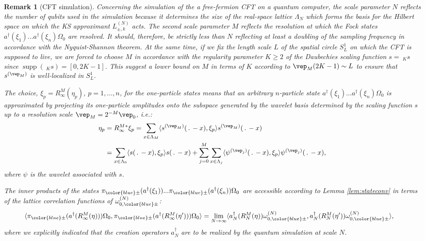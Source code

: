 \documentclass[a4paper, 11pt]{article}
\DeclareMathOperator{\1}{\mathds{1}}
\DeclareMathOperator{\supp}{supp}
\newtheorem{rem}[thm]{Remark}
\providecommand{\DIFaddbegin}{} %
\providecommand{\DIFaddend}{} %
\providecommand{\DIFaddincludegraphics}[2][]{{\color{blue}\fbox{\DIFOincludegraphics[#1]{#2}}}} %
\DeclareRobustCommand{\DIFaddbegin}{\DIFOaddbegin \let\includegraphics\DIFaddincludegraphics} %
\DeclareRobustCommand{\DIFaddend}{\DIFOaddend \let\includegraphics\DIFOincludegraphics} %
\begin{document}
\DIFaddend \begin{rem}[CFT simulation]
\label{rem:stateapprox}
Concerning the simulation of the a free-fermion CFT on a quantum computer, the scale parameter $N$ reflects the number of qubits used in the simulation because it determines the size of the real-space lattice $\Lambda_{N}$ which forms the basis for the Hilbert space on which the KS approximant $L^{(N)}_{\pm,k}$ acts. The second scale parameter $M$ reflects the resolution at which the Fock states $a^{\dagger}(\xi_{1})\dots a^{\dagger}(\xi_{n})\Omega_{0}$ are resolved. It should, therefore, be strictly less than $N$ reflecting at least a doubling of the sampling frequency in accordance with the Nyquist-Shannon theorem. At the same time, if we fix the length scale $L$ of the spatial circle $S^{1}_{L}$ on which the CFT is supposed to live, we are forced to choose $M$ in accordance with the regularity parameter $K\geq 2$ of the Daubechies scaling function $s=\!\ _{K}s$ since $\supp(\!\ _{K}s)=[0,2K-1]$. This suggest a lower bound on $M$ in terms of $K$ according to $\vep_{M}(2K-1)\sim L$ to ensure that $s^{(\vep_{M})}$ is well-localized in $S^{1}_{L}$.

The choice, $\xi_{p}=R^{M}_{\infty}(\eta_{p})$, $p=1,\dots,n$, for the one-particle states means that an arbitrary $n$-particle state $a^{\dagger}(\xi_{1})\dots a^{\dagger}(\xi_{n})\Omega_{0}$ is approximated by projecting its one-particle amplitudes onto the subspace generated by the wavelet basis determined by the scaling function $s$ up to a resolution scale $\vep_{M} = 2^{-M}\vep_{0}$, i.e.:
\begin{align*}
\eta_{p} & = R^{M}_{\infty}{}^{*}\xi_{p} = \sum_{x\in\Lambda_{M}}\langle s^{(\vep_{M})}(\!\ .\!\ -x),\xi_{p}\rangle s^{(\vep_{M})}(\!\ .\!\ -x) \\ 
& = \sum_{x\in\Lambda_{0}}\langle s(\!\ .\!\ -x),\xi_{p}\rangle s(\!\ .\!\ -x) + \sum_{j=0}^{M}\sum_{x\in\Lambda_{j}}\langle \psi^{(\vep_{j})}(\!\ .\!\ -x),\xi_{p}\rangle \psi^{(\vep_{j})}(\!\ .\!\ -x),
\end{align*}
where $\psi$ is the wavelet associated with $s$.

The inner products of the states $\pi_{{\color{blue}\pm}}(a^{\dagger}(\xi_{1}))...\pi_{{\color{blue}\pm}}(a^{\dagger}(\xi_{n}))\Omega_{0}$ are accessible according to Lemma \ref{lem:stateconv} in terms of the lattice correlation functions of $\omega^{(N)}_{0,{\color{blue}\pm}}$:
\begin{align*}
\langle \pi_{{\color{blue}\pm}}(a^{\dagger}(R^{M}_{\infty}(\eta)))\Omega_{0},\pi_{{\color{blue}\pm}}(a^{\dagger}(R^{M}_{\infty}(\eta')))\Omega_{0}\rangle & = \lim_{N\rightarrow\infty}\langle a^{\dagger}_{N}(R^{M}_{N}(\eta))\omega^{(N)}_{0,{\color{blue}\pm}},a^{\dagger}_{N}(R^{M}_{N}(\eta'))\omega^{(N)}_{0,{\color{blue}\pm}}\rangle,
\end{align*}
where we explicitly indicated that the creation operators $a^{\dagger}_{N}$ are to be realized by the quantum simulation at scale $N$.
\DIFaddbegin 


\end{rem}
\end{document}
